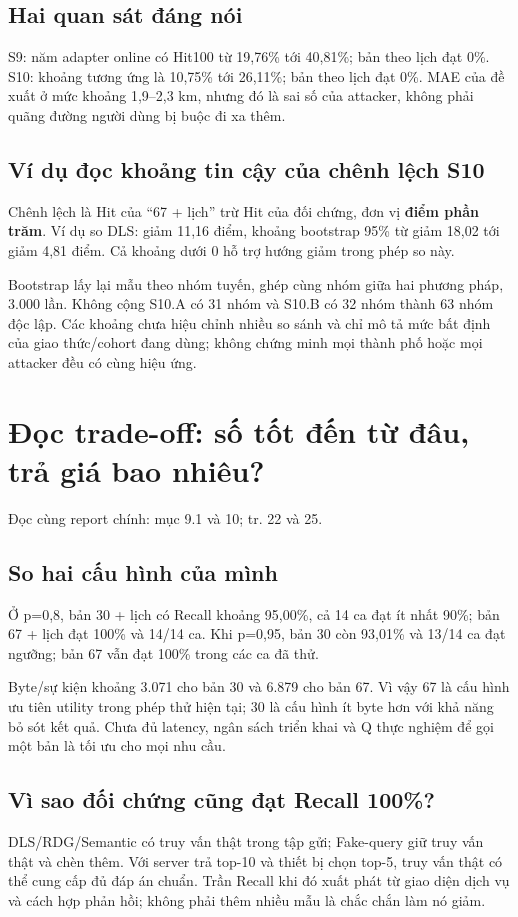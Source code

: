 \documentclass[10pt,a4paper]{article}
\newcommand{\where}[1]{\par{\small\color{gray}Đọc cùng report chính: #1.}\par}
\newcommand{\guidepage}[1]{\clearpage\section{#1}}
\begin{document}
\subsection*{Hai quan sát đáng nói}
S9: năm adapter online có Hit100 từ 19,76\% tới 40,81\%; bản theo lịch đạt 0\%. S10: khoảng tương ứng là 10,75\% tới 26,11\%; bản theo lịch đạt 0\%. MAE của đề xuất ở mức khoảng 1,9--2,3 km, nhưng đó là sai số của attacker, không phải quãng đường người dùng bị buộc đi xa thêm.

\subsection*{Ví dụ đọc khoảng tin cậy của chênh lệch S10}
\EndpointContrasts
Chênh lệch là Hit của ``67 + lịch'' trừ Hit của đối chứng, đơn vị \textbf{điểm phần trăm}. Ví dụ so DLS: giảm 11,16 điểm, khoảng bootstrap 95\% từ giảm 18,02 tới giảm 4,81 điểm. Cả khoảng dưới 0 hỗ trợ hướng giảm trong phép so này.

Bootstrap lấy lại mẫu theo nhóm tuyến, ghép cùng nhóm giữa hai phương pháp, 3.000 lần. Không cộng S10.A có 31 nhóm và S10.B có 32 nhóm thành 63 nhóm độc lập. Các khoảng chưa hiệu chỉnh nhiều so sánh và chỉ mô tả mức bất định của giao thức/cohort đang dùng; không chứng minh mọi thành phố hoặc mọi attacker đều có cùng hiệu ứng.

\guidepage{Đọc trade-off: số tốt đến từ đâu, trả giá bao nhiêu?}
\where{mục 9.1 và 10; tr. 22 và 25}
\subsection*{So hai cấu hình của mình}
Ở p=0,8, bản 30 + lịch có Recall khoảng 95,00\%, cả 14 ca đạt ít nhất 90\%; bản 67 + lịch đạt 100\% và 14/14 ca. Khi p=0,95, bản 30 còn 93,01\% và 13/14 ca đạt ngưỡng; bản 67 vẫn đạt 100\% trong các ca đã thử.

Byte/sự kiện khoảng 3.071 cho bản 30 và 6.879 cho bản 67. Vì vậy 67 là cấu hình ưu tiên utility trong phép thử hiện tại; 30 là cấu hình ít byte hơn với khả năng bỏ sót kết quả. Chưa đủ latency, ngân sách triển khai và Q thực nghiệm để gọi một bản là tối ưu cho mọi nhu cầu.

\subsection*{Vì sao đối chứng cũng đạt Recall 100\%?}
DLS/RDG/Semantic có truy vấn thật trong tập gửi; Fake-query giữ truy vấn thật và chèn thêm. Với server trả top-10 và thiết bị chọn top-5, truy vấn thật có thể cung cấp đủ đáp án chuẩn. Trần Recall khi đó xuất phát từ giao diện dịch vụ và cách hợp phản hồi; không phải thêm nhiều mẫu là chắc chắn làm nó giảm.
\end{document}
